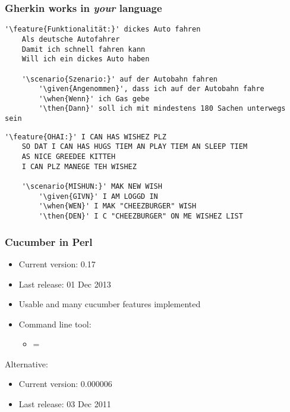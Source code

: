 \documentclass[10pt]{vcs_beamer}
\newcommand{\feature}[1]{\color{BlueViolet}{#1}}
\newcommand{\scenario}[1]{\color{BlueViolet}{#1}}
\newcommand{\given}[1]{\color{DarkOrange}{#1}}
\newcommand{\when}[1]{\color{RoyalBlue}{#1}}
\newcommand{\then}[1]{\color{ForestGreen}{#1}}
\begin{document}
\begin{frame}[fragile]
\frametitle{Gherkin works in \emph{your} language}

\begin{lstlisting}[escapeinside='']
'\feature{Funktionalität:}' dickes Auto fahren
    Als deutsche Autofahrer
    Damit ich schnell fahren kann
    Will ich ein dickes Auto haben

    '\scenario{Szenario:}' auf der Autobahn fahren
        '\given{Angenommen}', dass ich auf der Autobahn fahre
        '\when{Wenn}' ich Gas gebe
        '\then{Dann}' soll ich mit mindestens 180 Sachen unterwegs sein
\end{lstlisting}


\begin{lstlisting}[escapeinside='']
'\feature{OHAI:}' I CAN HAS WISHEZ PLZ
    SO DAT I CAN HAS HUGS TIEM AN PLAY TIEM AN SLEEP TIEM
    AS NICE GREEDEE KITTEH
    I CAN PLZ MANEGE TEH WISHEZ

    '\scenario{MISHUN:}' MAK NEW WISH
        '\given{GIVN}' I AM LOGGD IN
        '\when{WEN}' I MAK "CHEEZBURGER" WISH
        '\then{DEN}' I C "CHEEZBURGER" ON ME WISHEZ LIST
\end{lstlisting}

\end{frame}

\begin{frame}
    \frametitle{Cucumber in Perl}

    \begin{itemize}
        \item Current version: 0.17
        \item Last release: 01 Dec 2013
        \item Usable and many cucumber features implemented
        \item Command line tool: 
            \begin{itemize}
                \item {} = 
            \end{itemize}
    \end{itemize}

    Alternative: 
    \begin{itemize}
        \item Current version: 0.000006
        \item Last release: 03 Dec 2011
    \end{itemize}

\end{frame}
\end{document}
